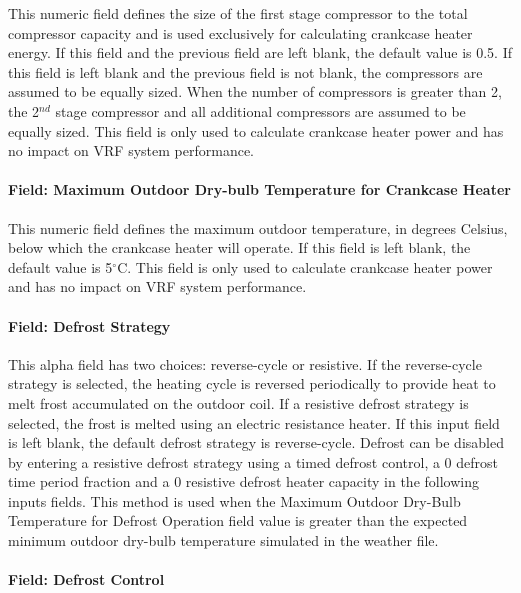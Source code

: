This numeric field defines the size of the first stage compressor to the total compressor capacity and is used exclusively for calculating crankcase heater energy. If this field and the previous field are left blank, the default value is 0.5. If this field is left blank and the previous field is not blank, the compressors are assumed to be equally sized. When the number of compressors is greater than 2, the 2\(^{nd}\) stage compressor and all additional compressors are assumed to be equally sized. This field is only used to calculate crankcase heater power and has no impact on VRF system performance.

\paragraph{Field: Maximum Outdoor Dry-bulb Temperature for Crankcase Heater}

This numeric field defines the maximum outdoor temperature, in degrees Celsius, below which the crankcase heater will operate. If this field is left blank, the default value is 5$^\circ$C. This field is only used to calculate crankcase heater power and has no impact on VRF system performance.

\paragraph{Field: Defrost Strategy}

This alpha field has two choices: reverse-cycle or resistive. If the reverse-cycle strategy is selected, the heating cycle is reversed periodically to provide heat to melt frost accumulated on the outdoor coil. If a resistive defrost strategy is selected, the frost is melted using an electric resistance heater. If this input field is left blank, the default defrost strategy is reverse-cycle. Defrost can be disabled by entering a resistive defrost strategy using a timed defrost control, a 0 defrost time period fraction and a 0 resistive defrost heater capacity in the following inputs fields. This method is used when the Maximum Outdoor Dry-Bulb Temperature for Defrost Operation field value is greater than the expected minimum outdoor dry-bulb temperature simulated in the weather file.

\paragraph{Field: Defrost Control}

